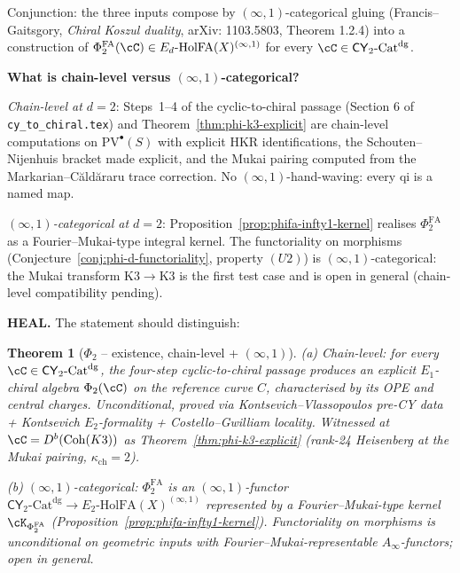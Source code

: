 \documentclass[11pt]{article}
\newtheorem{theorem}{Theorem}
\theoremstyle{definition}
\providecommand{\CY}{\mathsf{CY}}
\providecommand{\PhiFA}{\Phi^{\mathrm{FA}}}
\providecommand{\EdHolFA}{E_d\text{-}\mathrm{HolFA}}
\providecommand{\HolFA}{\mathrm{HolFA}}
\providecommand{\Ainf}{A_\infty}
\providecommand{\Eone}{E_1}
\providecommand{\Coh}{\mathrm{Coh}}
\providecommand{\kch}{\kappa_{\mathrm{ch}}}
\begin{document}
Conjunction: the three inputs compose by $(\infty,1)$-categorical
gluing (Francis--Gaitsgory, \emph{Chiral Koszul duality}, arXiv:
1103.5803, Theorem 1.2.4) into a construction of
$\PhiFA_2(\cC) \in \EdHolFA(X)^{(\infty,1)}$ for every
$\cC \in \CY_2\text{-}\mathrm{Cat}^{\mathrm{dg}}$.

\smallskip
\noindent\textbf{What is chain-level versus $(\infty,1)$-categorical?}

\smallskip
\emph{Chain-level at $d = 2$}: Steps~1--4 of the cyclic-to-chiral
passage (Section 6 of \texttt{cy\_to\_chiral.tex}) and
Theorem~\ref{thm:phi-k3-explicit} are chain-level computations on
$\mathrm{PV}^\bullet(S)$ with explicit HKR identifications, the
Schouten--Nijenhuis bracket made explicit, and the Mukai pairing
computed from the Markarian--C\u{a}ld\u{a}raru trace correction. No
$(\infty,1)$-hand-waving: every qi is a named map.

\emph{$(\infty,1)$-categorical at $d = 2$}: Proposition~\ref{prop:phifa-infty1-kernel}
realises $\PhiFA_2$ as a Fourier--Mukai-type integral kernel. The
functoriality on morphisms (Conjecture~\ref{conj:phi-d-functoriality},
property $(U2)$) is $(\infty,1)$-categorical: the Mukai transform
$\mathrm{K3} \to \mathrm{K3}$ is the first test case and is open in
general (chain-level compatibility pending).

\smallskip
\noindent\textbf{HEAL.} The statement should distinguish:

\begin{theorem}[$\Phi_2$ -- existence, chain-level + $(\infty,1)$]
\label{thm:phi-2-existence-heal}
\textup{(a)} \emph{Chain-level}: for every
$\cC \in \CY_2\text{-}\mathrm{Cat}^{\mathrm{dg}}$, the four-step
cyclic-to-chiral passage produces an explicit $\Eone$-chiral algebra
$\Phi_2(\cC)$ on the reference curve $C$, characterised by its OPE and
central charges. Unconditional, proved via Kontsevich--Vlassopoulos
pre-CY data + Kontsevich $E_2$-formality + Costello--Gwilliam locality.
Witnessed at $\cC = D^b(\Coh(K3))$ as Theorem~\ref{thm:phi-k3-explicit}
(rank-24 Heisenberg at the Mukai pairing, $\kch = 2$).

\textup{(b)} \emph{$(\infty,1)$-categorical}: $\PhiFA_2$ is an
$(\infty,1)$-functor $\CY_2\text{-}\mathrm{Cat}^{\mathrm{dg}} \to
E_2\text{-}\HolFA(X)^{(\infty,1)}$ represented by a Fourier--Mukai-type
kernel $\cK_{\PhiFA_2}$ (Proposition~\ref{prop:phifa-infty1-kernel}).
Functoriality on morphisms is unconditional on geometric inputs with
Fourier--Mukai-representable $\Ainf$-functors; open in general.
\end{theorem}
\end{document}
